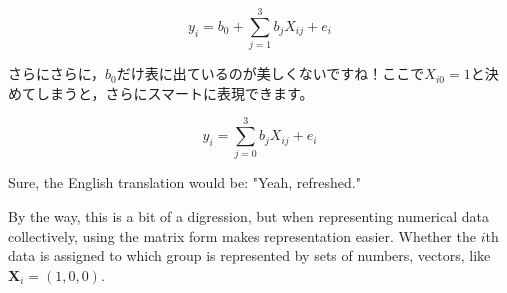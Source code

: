 \documentclass{ltjbook}
\begin{document}
\[ y_i = b_0 + \sum_{j=1}^3 b_j X_{ij} + e_i \]

さらにさらに，$b_0$だけ表に出ているのが美しくないですね！ここで$X_{i0}=1$と決めてしまうと，さらにスマートに表現できます。

\[ y_i = \sum_{j=0}^3 b_j X_{ij} + e_i \]

Sure, the English translation would be: "Yeah, refreshed."

By the way, this is a bit of a digression, but when representing numerical data collectively, using the matrix form makes representation easier. Whether the $i$th data is assigned to which group is represented by sets of numbers, vectors, like $\bm{X}_i = (1,0,0)$.
\end{document}
